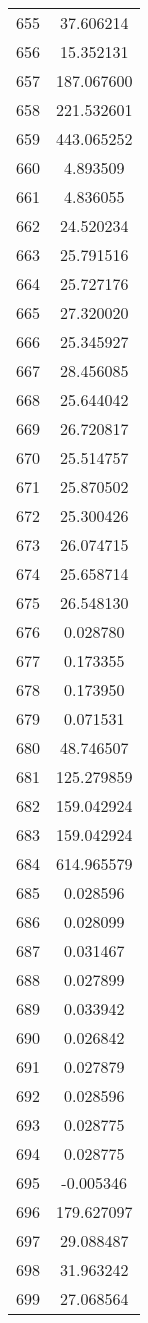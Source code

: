 \documentclass[12pt]{article}
\begin{document}
\begin{longtable}{@{}cc@{}}
655 & 37.606214 \\
656 & 15.352131 \\
657 & 187.067600 \\
658 & 221.532601 \\
659 & 443.065252 \\
660 & 4.893509 \\
661 & 4.836055 \\
662 & 24.520234 \\
663 & 25.791516 \\
664 & 25.727176 \\
665 & 27.320020 \\
666 & 25.345927 \\
667 & 28.456085 \\
668 & 25.644042 \\
669 & 26.720817 \\
670 & 25.514757 \\
671 & 25.870502 \\
672 & 25.300426 \\
673 & 26.074715 \\
674 & 25.658714 \\
675 & 26.548130 \\
676 & 0.028780 \\
677 & 0.173355 \\
678 & 0.173950 \\
679 & 0.071531 \\
680 & 48.746507 \\
681 & 125.279859 \\
682 & 159.042924 \\
683 & 159.042924 \\
684 & 614.965579 \\
685 & 0.028596 \\
686 & 0.028099 \\
687 & 0.031467 \\
688 & 0.027899 \\
689 & 0.033942 \\
690 & 0.026842 \\
691 & 0.027879 \\
692 & 0.028596 \\
693 & 0.028775 \\
694 & 0.028775 \\
695 & -0.005346 \\
696 & 179.627097 \\
697 & 29.088487 \\
698 & 31.963242 \\
699 & 27.068564 \\

\end{longtable}
\end{document}
